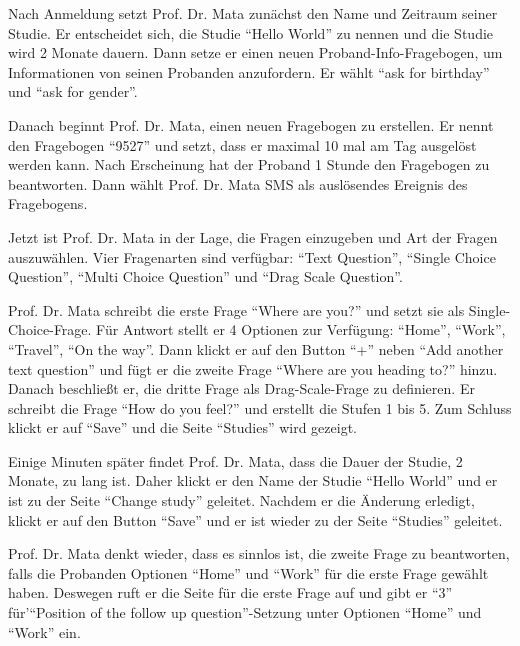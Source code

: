 \documentclass[a4paper]{scrreprt}
\begin{document}
                \par Nach Anmeldung setzt Prof. Dr. Mata zun\"achst den Name und Zeitraum seiner Studie. Er entscheidet sich, die Studie ``Hello World'' zu nennen und die Studie wird 2 Monate dauern. Dann setze er einen neuen Proband-Info-Fragebogen, um Informationen von seinen Probanden anzufordern. Er w\"ahlt ``ask for birthday'' und ``ask for gender''.

                \par Danach beginnt Prof. Dr. Mata, einen neuen Fragebogen zu erstellen. Er nennt den Fragebogen ``9527'' und setzt, dass er maximal 10 mal am Tag ausgel\"ost werden kann. Nach Erscheinung hat der Proband 1 Stunde den Fragebogen zu beantworten. Dann w\"ahlt Prof. Dr. Mata SMS als ausl\"osendes Ereignis des Fragebogens.

                \par Jetzt ist Prof. Dr. Mata in der Lage, die Fragen einzugeben und Art der Fragen auszuw\"ahlen. Vier Fragenarten sind verf\"ugbar: ``Text Question'', ``Single Choice Question'', ``Multi Choice Question'' und ``Drag Scale Question''.

                \par Prof. Dr. Mata schreibt die erste Frage ``Where are you?'' und setzt sie als Single-Choice-Frage. Für Antwort stellt er 4 Optionen zur Verf\"ugung: ``Home'', ``Work'', ``Travel'', ``On the way''. Dann klickt er auf den Button ``+'' neben ``Add another text question'' und f\"ugt er die zweite Frage ``Where are you heading to?'' hinzu. Danach beschließt er, die dritte Frage als Drag-Scale-Frage zu definieren. Er schreibt die Frage ``How do you feel?'' und erstellt die Stufen 1 bis 5. Zum Schluss klickt er auf ``Save'' und die Seite ``Studies'' wird gezeigt.

                \par Einige Minuten sp\"ater findet Prof. Dr. Mata, dass die Dauer der Studie, 2 Monate,  zu lang ist. Daher klickt er den Name der Studie ``Hello World'' und er ist zu der Seite ``Change study'' geleitet. Nachdem er die \"Anderung erledigt, klickt er auf den Button ``Save'' und er ist wieder zu der Seite ``Studies'' geleitet.

                \par Prof. Dr. Mata denkt wieder, dass es sinnlos ist, die zweite Frage zu beantworten, falls die Probanden Optionen ``Home'' und ``Work'' f\"ur die erste Frage gew\"ahlt haben. Deswegen ruft er die Seite f\"ur die erste Frage auf und gibt er ``3'' f\"ur'``Position of the follow up question''-Setzung unter Optionen ``Home'' und ``Work'' ein.
\end{document}
